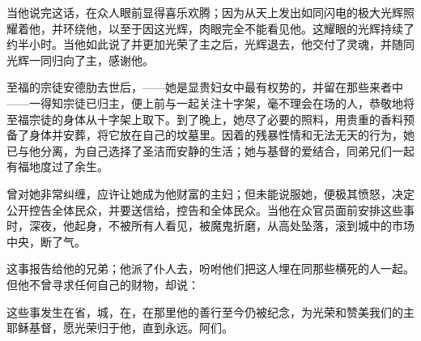 当他说完这话，在众人眼前显得喜乐欢腾；因为从天上发出如同闪电的极大光辉照耀着他，并环绕他，以至于因这光辉，肉眼完全不能看见他。这耀眼的光辉持续了约半小时。当他如此说了并更加光荣了主之后，光辉退去，他交付了灵魂，并随同光辉一同归向了主，感谢他。\par

至福的宗徒安德肋去世后，——她是显贵妇女中最有权势的，并留在那些来者中——一得知宗徒已归主，便上前与一起关注十字架，毫不理会在场的人，恭敬地将至福宗徒的身体从十字架上取下。到了晚上，她尽了必要的照料，用贵重的香料预备了身体并安葬，将它放在自己的坟墓里。因着的残暴性情和无法无天的行为，她已与他分离，为自己选择了圣洁而安静的生活；她与基督的爱结合，同弟兄们一起有福地度过了余生。\par

曾对她非常纠缠，应许让她成为他财富的主妇；但未能说服她，便极其愤怒，决定公开控告全体民众，并要送信给，控告和全体民众。当他在众官员面前安排这些事时，深夜，他起身，不被所有人看见，被魔鬼折磨，从高处坠落，滚到城中的市场中央，断了气。\par

这事报告给他的兄弟；他派了仆人去，吩咐他们把这人埋在同那些横死的人一起。但他不曾寻求任何自己的财物，却说：\par

这些事发生在省，城，在，在那里他的善行至今仍被纪念，为光荣和赞美我们的主耶稣基督，愿光荣归于他，直到永远。阿们。\par

